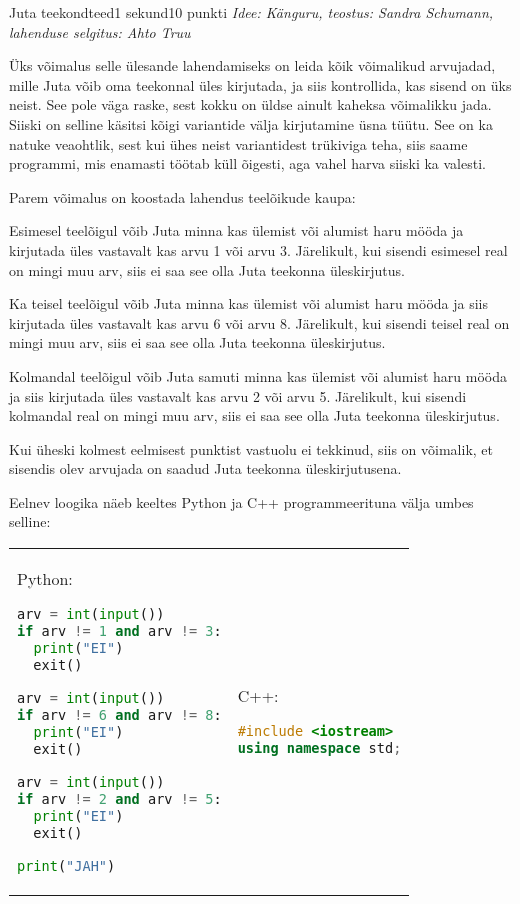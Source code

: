 \begin{yl}{1}{Juta teekond}{teed}{1 sekund}{10 punkti}
  \emph{Idee: Känguru, teostus: Sandra Schumann, lahenduse selgitus: Ahto Truu}

Üks võimalus selle ülesande lahendamiseks on leida kõik võimalikud arvujadad, mille Juta võib oma teekonnal üles kirjutada, ja siis kontrollida, kas sisend on üks neist. See pole väga raske, sest kokku on üldse ainult kaheksa võimalikku jada. Siiski on selline käsitsi kõigi variantide välja kirjutamine üsna tüütu. See on ka natuke veaohtlik, sest kui ühes neist variantidest trükiviga teha, siis saame programmi, mis enamasti töötab küll õigesti, aga vahel harva siiski ka valesti.

Parem võimalus on koostada lahendus teelõikude kaupa:
\begin{xenum}
\item Esimesel teelõigul võib Juta minna kas ülemist või alumist haru mööda ja kirjutada üles vastavalt kas arvu 1 või arvu 3. Järelikult, kui sisendi esimesel real on mingi muu arv, siis ei saa see olla Juta teekonna üleskirjutus.
\item Ka teisel teelõigul võib Juta minna kas ülemist või alumist haru mööda ja siis kirjutada üles vastavalt kas arvu 6 või arvu 8. Järelikult, kui sisendi teisel real on mingi muu arv, siis ei saa see olla Juta teekonna üleskirjutus.
\item Kolmandal teelõigul võib Juta samuti minna kas ülemist või alumist haru mööda ja siis kirjutada üles vastavalt kas arvu 2 või arvu 5. Järelikult, kui sisendi kolmandal real on mingi muu arv, siis ei saa see olla Juta teekonna üleskirjutus.
\item Kui üheski kolmest eelmisest punktist vastuolu ei tekkinud, siis on võimalik, et sisendis olev arvujada on saadud Juta teekonna üleskirjutusena.
\end{xenum}

Eelnev loogika näeb keeltes Python ja C++ programmeerituna välja umbes selline:

\begin{tabular}{p{\colwidth} p{\colwidth}}
Python:
\begin{lstlisting}[language=Python]
arv = int(input())
if arv != 1 and arv != 3:
  print("EI")
  exit()

arv = int(input())
if arv != 6 and arv != 8:
  print("EI")
  exit()

arv = int(input())
if arv != 2 and arv != 5:
  print("EI")
  exit()

print("JAH")
\end{lstlisting}
&
C++:
\begin{lstlisting}[language=C++]
#include <iostream>
using namespace std;


\end{lstlisting}
\end{tabular}
\end{yl}
